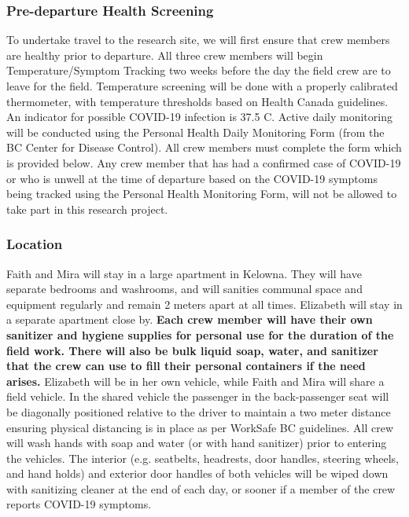 \documentclass[11pt,letter]{article}
\begin{document}
\subsubsection {Pre-departure Health Screening}
To undertake travel to the research site, we will first ensure that crew members are healthy prior to departure. All three crew members will begin Temperature/Symptom Tracking two weeks before the day the field crew are to leave for the field. Temperature screening will be done with a properly calibrated thermometer, with temperature thresholds based on Health Canada guidelines. An indicator for possible COVID-19 infection is 37.5 C. Active daily monitoring will be conducted using the Personal Health Daily Monitoring Form (from the BC Center for Disease Control). All crew members must complete the form which is provided below. Any crew member that has had a confirmed case of COVID-19 or who is unwell at the time of departure based on the COVID-19 symptoms being tracked using the Personal Health Monitoring Form, will not be allowed to take part in this research project.
   
\subsubsection{Location}
Faith and Mira will stay in a large apartment in Kelowna. They will have separate bedrooms and washrooms, and will sanities communal space and equipment regularly and remain 2 meters apart at all times. Elizabeth will stay in a separate apartment close by.  \textbf{Each crew member will have their own sanitizer and hygiene supplies for personal use for the duration of the field work. There will also be bulk liquid soap, water, and sanitizer that the crew can use to fill their personal containers if the need arises.} Elizabeth will be in her own vehicle, while Faith and Mira will share a field vehicle. In the shared vehicle the passenger in the back-passenger seat will be diagonally positioned relative to the driver to maintain a two meter distance ensuring physical distancing is in place as per WorkSafe BC guidelines. All crew will wash hands with soap and water (or with hand sanitizer) prior to entering the vehicles. The interior (e.g. seatbelts, headrests, door handles, steering wheels, and hand holds) and exterior door handles of both vehicles will be wiped down with sanitizing cleaner at the end of each day, or sooner if a member of the crew reports COVID-19 symptoms.  
\end{document}
